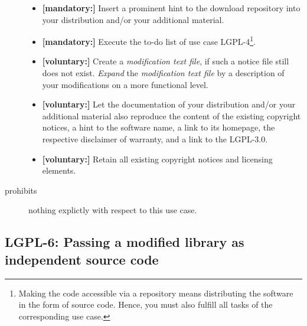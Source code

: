 \begin{description}
\begin{itemize}
  \item \textbf{[mandatory:]} Insert a prominent hint to the download repository
  into your distribution and/or your additional material.
  
  \item \textbf{[mandatory:]} Execute the to-do list of use case LGPL-4\footnote{
  Making the code accessible via a repository means distributing the software in
  the form of source code. Hence, you must also fulfill all tasks of the
  corresponding use case.}.
    
  \item \textbf{[voluntary:]} Create a \emph{modification text file}, if such a
  notice file still does not exist. \emph{Expand} the \emph{modification text
  file} by a description of your modifications on a more functional level.
  
  \item \textbf{[voluntary:]} Let the documentation of your distribution and/or
  your additional material also reproduce the content of the existing
  copyright notices, a hint to the software name, a link to its homepage,
  the respective disclaimer of warranty, and a link to the LGPL-3.0.
  
  \item \textbf{[voluntary:]} Retain all existing copyright notices and
  licensing elements. 


\end{itemize}

\item[prohibits] nothing explictly with respect to this use case.

\end{description}

\subsection{LGPL-6: Passing a modified library as independent source code}
\label{OSUC-08-LGPL}

